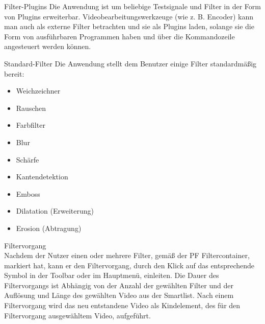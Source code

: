  Filter-Plugins
\newline
Die Anwendung ist um beliebige Testsignale und Filter in der Form von Plugins erweiterbar.
 Videobearbeitungswerkzeuge (wie z. B. Encoder) kann man auch als externe Filter betrachten und sie als
  Plugins laden, solange sie die Form von ausführbaren Programmen haben und über die Kommandozeile 
angesteuert werden können.

 Standard-Filter
\newline
Die Anwendung stellt dem Benutzer einige Filter standardmäßig bereit:
\begin{itemize}
\item Weichzeichner
\item Rauschen
\item Farbfilter
\item Blur
\item Schärfe
\item Kantendetektion
\item Emboss
\item Dilatation (Erweiterung)
\item Erosion (Abtragung)

\end{itemize}
 Filtervorgang\\
Nachdem der Nutzer einen oder mehrere Filter, gemäß der PF Filtercontainer, markiert hat, kann er
den Filtervorgang, durch den Klick auf das entsprechende Symbol in der Toolbar oder im Hauptmenü,
einleiten. Die Dauer des Filtervorgangs ist Abhängig von der Anzahl der gewählten Filter und der Auflösung
und Länge des gewählten Video aus der Smartlist. Nach einem Filtervorgang wird das neu entstandene Video
als Kindelement, des für den Filtervorgang ausgewähltem Video, aufgeführt.

